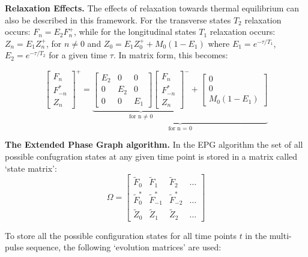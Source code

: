 \textbf{Relaxation Effects. } The effects of relaxation towards thermal equilibrium can also be described in this framework.
For the transverse states $T_2$ relaxation occurs: $F_n = E_2 F_n^+$, while for the longitudinal states $T_1$ relaxation occurs: $Z_n = E_1 Z_n^+$, for $n \neq 0$ and $Z_0 = E_1 Z_0^+ + M_0(1 - E_1)$ where $E_1 = e^{-\tau/T_1}$, $E_2 = e^{-\tau/T_2}$ for a given time $\tau$.
In matrix form, this becomes:

\begin{equation}\label{eq:woessnerFn}
    \begin{bmatrix}
        F_n      \\
        F_{-n}^* \\
        Z_n
    \end{bmatrix}^+ = 
    \underbrace{
    \underbrace{\begin{bmatrix}
        E_2 & 0 & 0 \\
        0 & E_2 & 0 \\
        0 & 0 & E_1 
    \end{bmatrix}
    \begin{bmatrix}
        F_n      \\
        F_{-n}^* \\
        Z_n
    \end{bmatrix}^-}_\text{for n $\neq$ 0}
    +
    \begin{bmatrix}
        0 \\
        0 \\
        M_0 (1 - E_1)
    \end{bmatrix}}_\text{for n = 0}
\end{equation}

\hfill

\textbf{The Extended Phase Graph algorithm. } In the EPG algorithm the set of all possible confugration states at any given time point is stored in a matrix called `state matrix':
\begin{equation}
    \Omega = 
    \begin{bmatrix}
    \widetilde{F}_0 & \widetilde{F}_1 & \widetilde{F}_2 & \dots \\
    \widetilde{F}_0^* & \widetilde{F}_{-1}^* & \widetilde{F}_{-2}^* & \dots \\
    \widetilde{Z}_0 & \widetilde{Z}_1 & \widetilde{Z}_2 & \dots 
    \end{bmatrix}
\end{equation}

To store all the possible configuration states for all time points $t$ in the multi-pulse sequence, the following `evolution matrices' are used:

